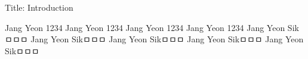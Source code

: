 Title: Introduction


Jang Yeon 1234
Jang Yeon 1234
Jang Yeon 1234
Jang Yeon 1234
Jang Yeon Sikㅁㅁㅁ
Jang Yeon Sikㅁㅁㅁ
Jang Yeon Sikㅁㅁㅁ
Jang Yeon Sikㅁㅁㅁ
Jang Yeon Sikㅁㅁㅁ